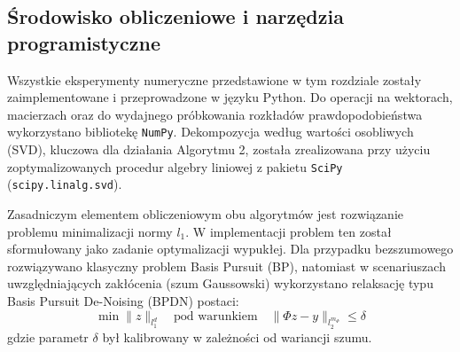 \subsection{Środowisko obliczeniowe i narzędzia programistyczne}

Wszystkie eksperymenty numeryczne przedstawione w tym rozdziale zostały zaimplementowane i przeprowadzone w języku Python. Do operacji na wektorach, macierzach oraz do wydajnego próbkowania rozkładów prawdopodobieństwa wykorzystano bibliotekę \texttt{NumPy}. Dekompozycja według wartości osobliwych (SVD), kluczowa dla działania Algorytmu 2, została zrealizowana przy użyciu zoptymalizowanych procedur algebry liniowej z pakietu \texttt{SciPy} (\texttt{scipy.linalg.svd}).

Zasadniczym elementem obliczeniowym obu algorytmów jest rozwiązanie problemu minimalizacji normy $l_1$. W implementacji problem ten został sformułowany jako zadanie optymalizacji wypukłej. Dla przypadku bezszumowego rozwiązywano klasyczny problem Basis Pursuit (BP), natomiast w scenariuszach uwzględniających zakłócenia (szum Gaussowski) wykorzystano relaksację typu Basis Pursuit De-Noising (BPDN) postaci:
$$\min \|z\|_{l_1^d} \quad \text{pod warunkiem} \quad \|\Phi z - y\|_{l_2^{m_\Phi}} \le \delta$$
gdzie parametr $\delta$ był kalibrowany w zależności od wariancji szumu.